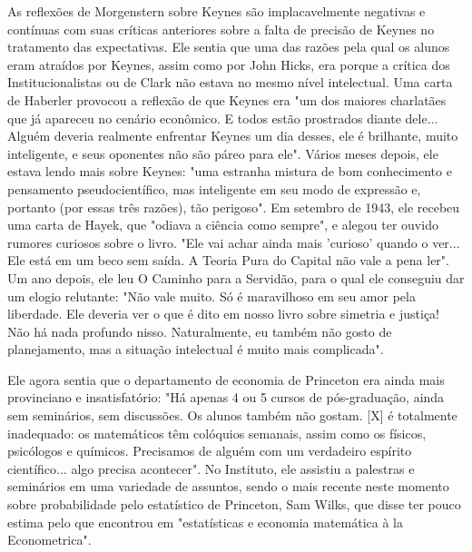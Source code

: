 \documentclass[a4paper,12pt]{article}[abntex2]
\begin{document}
As reflexões de Morgenstern sobre Keynes são implacavelmente negativas e contínuas com suas críticas anteriores sobre a falta de precisão de Keynes no tratamento das expectativas. Ele sentia que uma das razões pela qual os alunos eram atraídos por Keynes, assim como por John Hicks, era porque a crítica dos Institucionalistas ou de Clark não estava no mesmo nível intelectual. Uma carta de Haberler provocou a reflexão de que Keynes era "um dos maiores charlatães que já apareceu no cenário econômico. E todos estão prostrados diante dele... Alguém deveria realmente enfrentar Keynes um dia desses, ele é brilhante, muito inteligente, e seus oponentes não são páreo para ele". Vários meses depois, ele estava lendo mais sobre Keynes: "uma estranha mistura de bom conhecimento e pensamento pseudocientífico, mas inteligente em seu modo de expressão e, portanto (por essas três razões), tão perigoso". Em setembro de 1943, ele recebeu uma carta de Hayek, que "odiava a ciência como sempre", e alegou ter ouvido rumores curiosos sobre o livro. "Ele vai achar ainda mais 'curioso' quando o ver... Ele está em um beco sem saída. A Teoria Pura do Capital não vale a pena ler". Um ano depois, ele leu O Caminho para a Servidão, para o qual ele conseguiu dar um elogio relutante: "Não vale muito. Só é maravilhoso em seu amor pela liberdade. Ele deveria ver o que é dito em nosso livro sobre simetria e justiça! Não há nada profundo nisso. Naturalmente, eu também não gosto de planejamento, mas a situação intelectual é muito mais complicada".

Ele agora sentia que o departamento de economia de Princeton era ainda mais provinciano e insatisfatório: "Há apenas 4 ou 5 cursos de pós-graduação, ainda sem seminários, sem discussões. Os alunos também não gostam. [X] é totalmente inadequado: os matemáticos têm colóquios semanais, assim como os físicos, psicólogos e químicos. Precisamos de alguém com um verdadeiro espírito científico... algo precisa acontecer". No Instituto, ele assistiu a palestras e seminários em uma variedade de assuntos, sendo o mais recente neste momento sobre probabilidade pelo estatístico de Princeton, Sam Wilks, que disse ter pouco estima pelo que encontrou em "estatísticas e economia matemática à la Econometrica".
\end{document}
